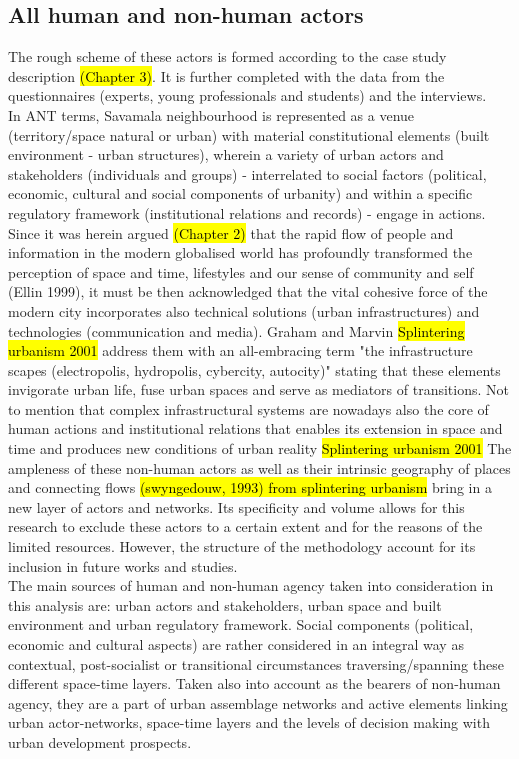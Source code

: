 \documentclass[11pt]{report}
\begin{document}
\subsection{All human and non-human actors}

The rough scheme of these actors is formed according to the case study description \hl{(Chapter 3)}. It is further completed with the data from the questionnaires (experts, young professionals and students) and the interviews.
\\
In ANT terms, Savamala neighbourhood is represented as a venue (territory/space natural or urban) with material constitutional elements (built environment - urban structures), wherein a variety of urban actors and stakeholders (individuals and groups) - interrelated to social factors (political, economic, cultural and social components of urbanity) and within a specific regulatory framework (institutional relations and records) - engage in actions.
Since it was herein argued \hl{(Chapter 2)} that the rapid flow of people and information in the modern globalised world has profoundly transformed the perception of space and time, lifestyles and our sense of community and self (Ellin 1999), it must be then acknowledged that the vital cohesive force of the modern city incorporates also technical solutions (urban infrastructures) and technologies (communication and media).
Graham and Marvin \hl{Splintering urbanism 2001} address them with an  all-embracing term "the infrastructure scapes (electropolis, hydropolis, cybercity, autocity)" stating that these elements invigorate urban life, fuse urban spaces and serve as mediators of transitions. Not to mention that complex infrastructural systems are nowadays also the core of human actions and institutional relations that enables its extension in space and time and produces new conditions of urban reality \hl{Splintering urbanism 2001}
The ampleness of these non-human actors as well as their intrinsic 
geography of places and connecting flows \hl{(swyngedouw, 1993) from splintering urbanism} bring in a new layer of actors and networks. Its specificity and volume allows for this research to exclude these actors to a certain extent and for the reasons of the limited resources. 
However, the structure of the methodology account for its inclusion in future works and studies. 
\\
The main sources of human and non-human agency taken into consideration in this analysis are: urban actors and stakeholders, urban space and built environment and urban regulatory framework. Social components (political, economic and cultural aspects) are rather considered in an integral way as contextual, post-socialist or transitional circumstances traversing/spanning these different space-time layers. Taken also into account as the bearers of non-human agency, they are a part of urban assemblage networks and active elements linking urban actor-networks, space-time layers and the levels of decision making with urban development prospects.
\end{document}
